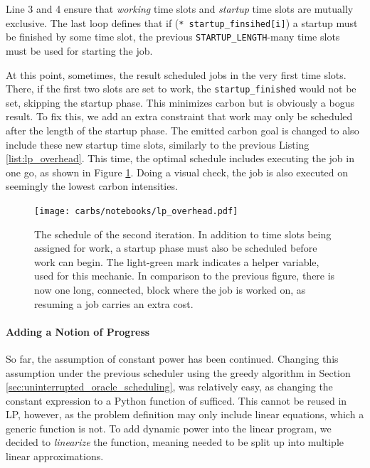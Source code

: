 Line 3 and 4 ensure that \emph{working} time slots and \emph{startup} time slots are mutually exclusive.
The last loop defines that if (\verb|* startup_finsihed[i]|) a startup must be finished by some time slot, the previous \verb|STARTUP_LENGTH|-many time slots must be used for starting the job.

At this point, sometimes, the result scheduled jobs in the very first time slots.
There, if the first two slots are set to work, the \verb|startup_finished| would not be set, skipping the startup phase.
This minimizes carbon but is obviously a bogus result.
To fix this, we add an extra constraint that work may only be scheduled after the length of the startup phase.
The emitted carbon goal is changed to also include these new startup time slots, similarly to the previous Listing \ref{list:lp_overhead}. 
This time, the optimal schedule includes executing the job in one go, as shown in Figure \ref{fig:lp_overhead}.
Doing a visual check, the job is also executed on seemingly the lowest carbon intensities.

\begin{figure}
    \texttt{[image: carbs/notebooks/lp\_overhead.pdf]}
    \caption{The schedule of the second iteration. In addition to time slots being assigned for work, a startup phase must also be scheduled before work can begin. The light-green mark indicates a helper variable, used for this mechanic. In comparison to the previous figure, there is now one long, connected, block where the job is worked on, as resuming a job carries an extra cost.}
    \label{fig:lp_overhead}
\end{figure}

\newpage
\paragraph{Adding a Notion of Progress}

So far, the assumption of constant power has been continued.
Changing this assumption under the previous scheduler using the greedy algorithm in Section \ref{sec:uninterrupted_oracle_scheduling}, was relatively easy, as changing the constant expression to a Python function of \modelname{} sufficed. 
This cannot be reused in LP, however, as the problem definition may only include linear equations, which a generic function is not. 
To add dynamic power into the linear program, we decided to \emph{linearize} the function, meaning \modelname{} needed to be split up into multiple linear approximations.

